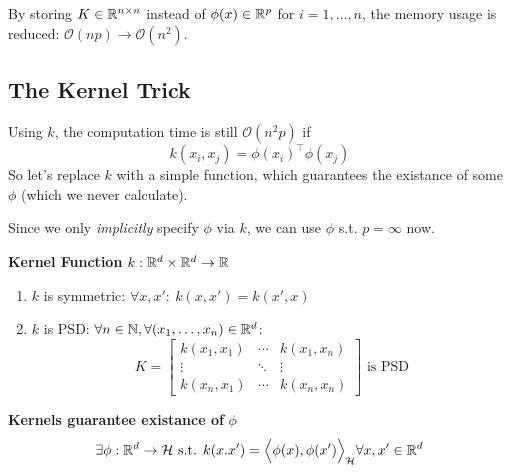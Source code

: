 By storing $K \in \mathbb{R}^{n\times n}$ instead of $\phi(x) \in \mathbb{R}^p$ for $i=1,\ldots,n$, the memory usage is reduced: $\mathcal{O}(np) \to \mathcal{O}(n^2)$.

\newpage
\subsection{The Kernel Trick}

Using $k$, the computation time is still $\mathcal{O}(n^2p)$ if 
$$
    k(x_i,x_j) = \phi(x_i)^\top \phi(x_j)
$$
So let's replace $k$ with a simple function, which guarantees the existance of some $\phi$ (which we never calculate).

{\scriptsize
    \remark Since we only \textit{implicitly} specify $\phi$ via $k$, we can use $\phi$ s.t. $p=\infty$ now.
}

 \textbf{Kernel Function} $k: \mathbb{R}^d \times \mathbb{R}^d \to \mathbb{R}$
\begin{enumerate}
    \item $k$ is symmetric: $\forall x,x':\ k(x,x') = k(x',x)$
    \item $k$ is PSD: $\forall n \in \mathbb{N}, \forall (x_1,\ldots,x_n) \in \mathbb{R}^d$:
    $$
        K = \begin{bmatrix}
            k(x_1,x_1)  & \cdots    & k(x_1,x_n)    \\
            \vdots      & \ddots    & \vdots        \\
            k(x_n,x_1)  & \cdots    & k(x_n,x_n)
        \end{bmatrix} \text{ is PSD}
    $$
\end{enumerate}

\theorem \textbf{Kernels guarantee existance of} $\phi$\\
$$
    \exists\phi:\mathbb{R}^d\to\mathcal{H} \text{ s.t. } k(x.x') = \Bigl\langle \phi(x),\phi(x') \Bigr\rangle_\mathcal{H} \forall x,x' \in \mathbb{R}^d
$$

